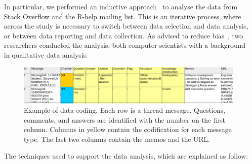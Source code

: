 In particular, we performed an inductive approach~\cite{Runeson2012} to analyse the data from Stack Overflow and the R-help mailing list.
This is an iterative process, where across the study is necessary to switch between data selection and data analysis, or between data reporting and data collection.
As advised to reduce bias~\cite{Runeson2012}, two researchers conducted the analysis, both computer scientists with a background in qualitative data analysis.

\begin{figure}[!htb]
	\centering
	\includegraphics[width=.9\textwidth]{Figures/CodingExample}
	\caption{Example of data coding. Each row is a thread message. Questions, comments, and answers are identified with the number on the first column. Columns in yellow contain the codification for each message type. The last two columns contain the memos and the URL.}
	\label{fig:CodingExample}
\end{figure}



The techniques used to support the data analysis, which are explained as follow:

